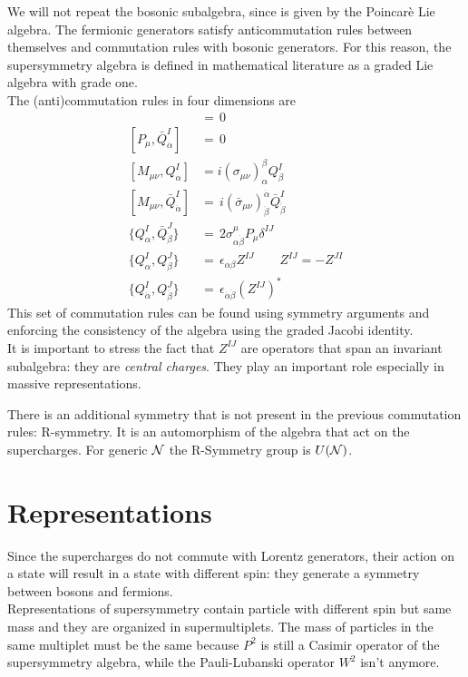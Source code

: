 \begin{appendices}
We will not repeat the bosonic subalgebra, since is given by the Poincarè Lie algebra.
The fermionic generators satisfy anticommutation rules between themselves and commutation rules with bosonic generators.
For this reason, the supersymmetry algebra is defined in mathematical literature as a graded Lie algebra with grade one. 
\\
The (anti)commutation rules in four dimensions are
\begin{align}
	[P_{\mu}, Q_{\alpha}^I ] & = \, 0 \\
	[P_{\mu}, \bar{Q}_{\dot{\alpha}}^I ] & = \, 0 \\
	[M_{\mu \nu}, Q_{\alpha}^I] & = i (\sigma_{\mu \nu})_{\alpha}^{\beta} Q_{\beta}^I \\
	[M_{\mu \nu}, \bar{Q}_{\dot{\alpha}}^I ] & = \, i (\bar{\sigma}_{\mu \nu})^{\dot{\alpha}}_{\dot{\beta}} \bar{Q}_{\dot{\dot{\beta}}}^I \\
	\{ Q_{\alpha}^I ,\bar{Q}_{\dot{\beta}}^J \}  & = \, 2 \sigma^\mu_{ \alpha \dot{\beta}} P_{\mu} \delta^{IJ} \\ 
	\{Q_{\alpha}^I, Q_{\beta}^J \} & = \, \epsilon_{\alpha \beta} Z^{I J } \qquad Z^{IJ} = - Z^{JI} \\
	\{Q_{\dot{\alpha}}^I, Q_{\dot{\beta}}^J \} & = \, \epsilon_{\dot{\alpha} \dot{\beta}} \left( Z^{I J } \right)^* 
\end{align}
This set of commutation rules can be found using symmetry arguments and enforcing the consistency of the algebra using the graded Jacobi identity.\\
It is important to stress the fact that $Z^{IJ}$ are operators that span an invariant subalgebra: they are \emph{central charges}.
They play an important role especially in massive representations.

There is an additional symmetry that is not present in the previous commutation rules: R-symmetry.
It is an automorphism of the algebra that act on the supercharges.
For generic $\mathcal{N}$ the R-Symmetry group is  $U(\mathcal{N})$.









\section{Representations}
Since the supercharges do not commute with Lorentz generators, their action on a state will result in a state with different spin: they generate a symmetry between bosons and fermions.\\
Representations of supersymmetry contain particle with different spin but same mass and they are organized in supermultiplets.
The mass of particles in the same multiplet must be the same because $P^2$ is still a Casimir operator of the supersymmetry algebra, while the Pauli-Lubanski operator $W^2$ isn't anymore.  


\end{appendices}

